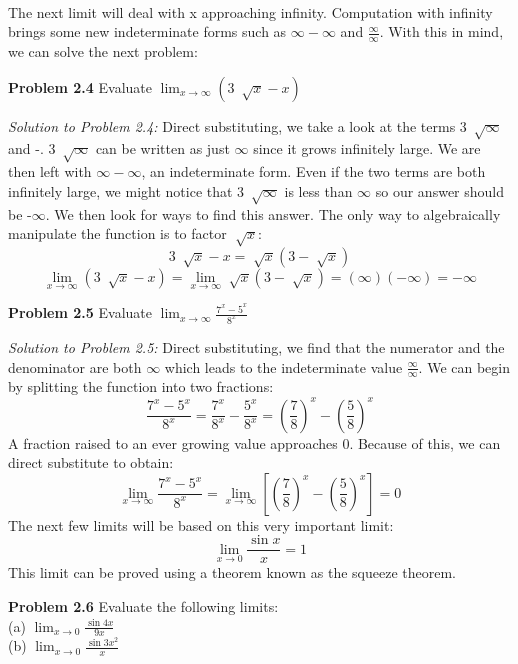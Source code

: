 \documentclass[11pt]{scrartcl}
\begin{document}
\\
\noindent 
The next limit will deal with x approaching infinity. Computation with infinity brings some new indeterminate forms such as $\infty-\infty$ and $\frac{\infty}{\infty}$. With this in mind, we can solve the next problem:
\\
\begin{tcolorbox}
[colback=purple!5!white,colframe=purple!75!black]
\textbf{Problem 2.4} Evaluate $\lim_{x \to \infty} (3\:\sqrt[]{x}-x)$
\end{tcolorbox}
\noindent
\textit{Solution to Problem 2.4:}
Direct substituting, we take a look at the terms $3\:\sqrt[]{\infty}$ and -\infty. \;$3\:\sqrt[]{\infty}$ can be written as just $\infty$ since it grows infinitely large. We are then left with $\infty-\infty$, an indeterminate form. Even if the two terms are both infinitely large, we might notice that $3\:\sqrt[]{\infty}$ is less than $\infty$ so our answer should be -$\infty$. We then look for ways to find this answer. The only way to algebraically manipulate the function is to factor $\sqrt[]{x}$:
$$3\:\sqrt[]{x}-x=\sqrt[]{x}(3-\sqrt[]{x})$$
$$\lim_{x \to \infty} (3\:\sqrt[]{x}-x)=\lim_{x \to \infty} \sqrt[]{x}(3-\sqrt[]{x})=(\infty)(-\infty)=-\infty$$
\begin{tcolorbox}
[colback=purple!5!white,colframe=purple!75!black]
\textbf{Problem 2.5} Evaluate $\lim_{x \to \infty} \frac{7^x-5^x}{8^x}$
\end{tcolorbox}
\noindent
\textit{Solution to Problem 2.5:} Direct substituting, we find that the numerator and the denominator are both $\infty$ which leads to the indeterminate value $\frac{\infty}{\infty}$. We can begin by splitting the function into two fractions:
$$\frac{7^x-5^x}{8^x}=\frac{7^x}{8^x}-\frac{5^x}{8^x}=\left(\frac{7}{8}\right)^x-\left(\frac{5}{8}\right)^x$$
A fraction raised to an ever growing value approaches 0. Because of this, we can direct substitute to obtain:
$$\lim_{x \to \infty} \frac{7^x-5^x}{8^x}=\lim_{x \to \infty} \left[\left(\frac{7}{8}\right)^x-\left(\frac{5}{8}\right)^x\right]=0$$
\noindent
   The next few limits will be based on this very important limit:
   $$\lim_{x \to 0} \frac{\sin x}{x}=1$$
\noindent
This limit can be proved using a theorem known as the squeeze theorem. 
\\
\begin{tcolorbox}
[colback=purple!5!white,colframe=purple!75!black]
\textbf{Problem 2.6} Evaluate the following limits:\\

(a) $\lim_{x \to 0} \frac{\sin 4x}{9x}$\\

(b) $\lim_{x \to 0} \frac{\sin 3x^2}{x}$
\end{tcolorbox}
\end{document}
